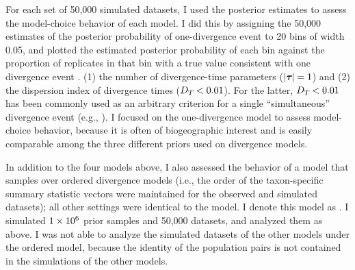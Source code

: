 For each set of 50,000 simulated datasets, I used the posterior estimates
to assess the model-choice behavior of each model.
I did this by assigning the 50,000 estimates of the posterior probability
of one-divergence event to 20 bins of width 0.05, and plotted
the estimated posterior probability of each bin against the proportion of
replicates in that bin with a true value consistent with one divergence
event \cite{Huelsenbeck2004,Oaks2012}.
(1) the number of divergence-time parameters ($\lvert \boldsymbol{\tau_{}} \rvert = 1$) and
(2) the dispersion index of divergence times ($D_{T_{}} < 0.01$).
For the latter, $D_{T_{}} < 0.01$ has been commonly used as an
arbitrary criterion for a single ``simultaneous'' divergence event
(e.g., \cite{Hickerson2006,Leache2007,Stone2012}).
I focused on the one-divergence model to assess model-choice behavior, because
it is often of biogeographic interest and is easily comparable among
the three different priors used on divergence models.

In addition to the four models above, I also assessed the behavior of a model
that samples over ordered divergence models (i.e., the order of the
taxon-specific summary statistic vectors were maintained for the observed and
simulated datasets); all other settings were identical to the \modelDPP model.
I denote this model as \modelDPPOrdered.
I simulated $1\times 10^{6}$ prior samples and 50,000 datasets, and
analyzed them as above.
I was not able to analyze the simulated datasets of the other models under
the ordered model, because the identity of the population pairs is not
contained in the simulations of the other models.

